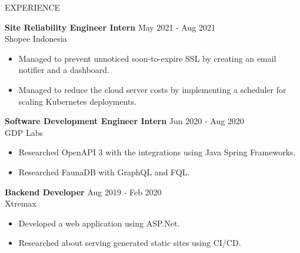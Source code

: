 \documentclass{resume} %
\begin{document}
\begin{rSection}{EXPERIENCE}


\textbf{Site Reliability Engineer Intern} \hfill May 2021 - Aug 2021\\
Shopee Indonesia
\begin{itemize}
  \itemsep -3pt {}
  \item Managed to prevent unnoticed soon-to-expire SSL by creating an email notifier and a dashboard.
  \item Managed to reduce the cloud server costs by implementing a scheduler for scaling Kubernetes deployments.
\end{itemize}



\textbf{Software Development Engineer Intern} \hfill Jun 2020 - Aug 2020\\
GDP Labs
\begin{itemize}
  \itemsep -3pt {}
  \item Researched OpenAPI 3 with the integrations using Java Spring Frameworks.
  \item Researched FaunaDB with GraphQL and FQL.
\end{itemize}

\textbf{Backend Developer} \hfill Aug 2019 - Feb 2020\\
Xtremax
\begin{itemize}
  \itemsep -3pt {}
  \item Developed a web application using ASP.Net.
  \item Researched about serving generated static sites using CI/CD.
\end{itemize}

\end{rSection}
\end{document}
